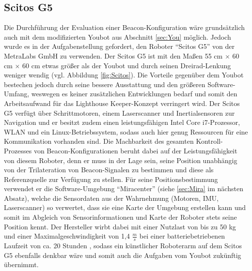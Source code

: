 \subsection{Scitos G5}
Die Durchführung der Evaluation einer Beacon-Konfiguration wäre grundsätzlich auch mit dem modifizierten Youbot aus Abschnitt \ref{sec:You} möglich. Jedoch wurde es in der Aufgabenstellung gefordert, den Roboter "`Scitos G5"' von der MetraLabs GmbH zu verwenden. Der Scitos G5 ist mit den Maßen 55 cm $\times$ 60 cm $\times$ 60 cm etwas größer als der Youbot und durch seinen Dreirad-Lenkung weniger wendig (vgl. Abbildung \ref{fig:Scitos}). Die Vorteile gegenüber dem Youbot bestechen jedoch durch seine bessere Ausstattung und den größeren Software-Umfang, weswegen es keiner zusätzlichen Entwicklungen bedarf und somit den Arbeitsaufwand für das Lighthouse Keeper-Konzept verringert wird. Der Scitos G5 verfügt über Schrittmotoren, einem Laserscanner und Inertialsensoren zur Navigation und er besitzt zudem einen leistungsfähigen Intel Core i7-Prozessor, WLAN und ein Linux-Betriebssystem, sodass auch hier genug Ressourcen für eine Kommunikation vorhanden sind. Die Machbarkeit des gesamten Kontroll-Prozesses von Beacon-Konfigurationen beruht dabei auf der Leistungsfähigkeit von diesem Roboter, denn er muss in der Lage sein, seine Position unabhängig von der Trilateration von Beacon-Signalen zu bestimmen und diese als Referenzquelle zur Verfügung zu stellen. Für seine Positionsbestimmung verwendet er die Software-Umgebung "`Miracenter"' (siehe \ref{sec:Mira} im nächsten Absatz), welche die Sensordaten aus der Wahrnehmung (Motoren, IMU, Laserscanner) so verwertet, dass sie eine Karte der Umgebung erstellen kann und somit im Abgleich von Sensorinformationen und Karte der Roboter stets seine Position kennt. Der Hersteller wirbt dabei mit einer Nutzlast von bis zu 50 kg und einer Maximalgeschwindigkeit von 1,4 $\frac{m}{s}$ bei einer batteriebetriebenen Laufzeit von ca. 20 Stunden \cite{Mira}, sodass ein künstlicher Roboterarm auf dem Scitos G5 ebenfalls denkbar wäre und somit auch die Aufgaben vom Youbot zukünftig übernimmt.
